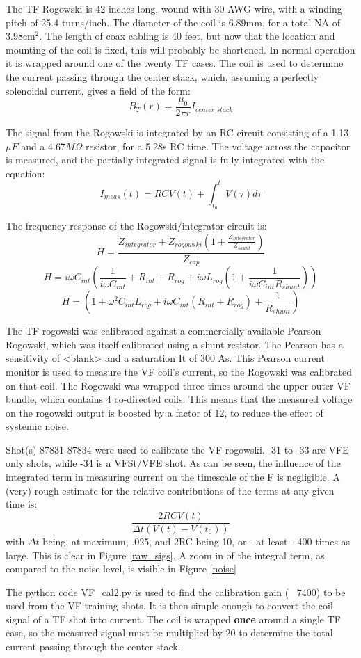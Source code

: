 \documentclass{article}
\begin{document}
\begin{large}
The TF Rogowski is 42 inches long, wound with 30 AWG wire, with a winding pitch of 25.4 turns/inch.  The diameter of the coil is 6.89mm, for a total NA of 3.98cm$^2$. The length of coax cabling is 40 feet, but now that the location and mounting of the coil is fixed, this will probably be shortened. In normal operation it is wrapped around one of the twenty TF cases.  The coil is used to determine the current passing through the center stack, which, assuming a perfectly solenoidal current, gives a field of the form: $$B_T(r) = \frac{\mu_0}{2 \pi r} I_{center\_stack}$$
\par
The signal from the Rogowski is integrated by an RC circuit consisting of a 1.13$\mu F$ and a 4.67$M\Omega$ resistor, for a 5.28s RC time.  The voltage across the capacitor is measured, and the partially integrated signal is fully integrated with the equation: 
$$I_{meas}(t) = RCV(t)+\int_{t_0}^t V(\tau)d\tau$$
\par
The frequency response of the Rogowski/integrator circuit is:
$$ H = \frac{Z_{integrator}+Z_{rogowski}(1+ \frac{Z_{integrator}}{Z_{shunt}})}{Z_{cap}}$$
$$ H = i\omega C_{int}(\frac{1}{i\omega C_{int}}+ R_{int} + R_{rog}+i\omega L_{rog}(1+ \frac{1}{i\omega C_{int} R_{shunt}}))$$
$$H = (1 +\omega^2C_{int} L_{rog}+i\omega C_{int}(R_{int} + R_{rog})+\frac{1}{R_{shunt}})$$

The TF rogowski was calibrated against a commercially available Pearson Rogowski, which was itself calibrated using a shunt resistor.  The Pearson has a sensitivity of <blank> and a saturation It of 300 As. This Pearson current monitor is used to measure the VF coil's current, so the Rogowski was calibrated on that coil.  The Rogowski was wrapped three times around the upper outer VF bundle, which contains 4 co-directed coils.  This means that the measured voltage on the rogowski output is boosted by a factor of 12, to reduce the effect of systemic noise.\par
Shot(s) 87831-87834 were used to calibrate the VF rogowski.  -31 to -33 are VFE only shots, while -34 is a VFSt/VFE shot.  As can be seen, the influence of the integrated term in measuring current on the timescale of the F is negligible.  A (very) rough estimate for the relative contributions of the terms at any given time is: $$\frac{2RCV(t)}{\Delta t(V(t)-V(t_0))}$$
with $\Delta t$ being, at maximum, .025, and 2RC being 10, or - at least - 400 times as large.  This is clear in Figure \ref{raw_sigs}.  A zoom in of the integral term, as compared to the noise level, is visible in Figure \ref{noise}
\par
The python code VF\_cal2.py is used to find the calibration gain (~ 7400) to be used from the VF training shots.  It is then simple enough to convert the coil signal of a TF shot into current.  The coil is wrapped \textbf{once} around a single TF case, so the measured signal must be multiplied by 20 to determine the total current passing through the center stack.


\end{large}
\end{document}
